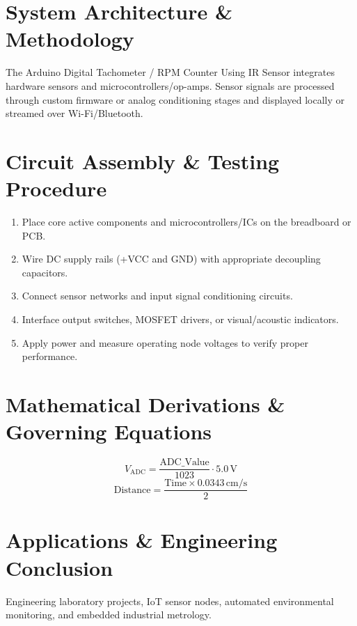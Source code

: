 \documentclass[11pt,a4paper]{article}
\begin{document}
\section{System Architecture \& Methodology}
The Arduino Digital Tachometer / RPM Counter Using IR Sensor integrates hardware sensors and microcontrollers/op-amps. Sensor signals are processed through custom firmware or analog conditioning stages and displayed locally or streamed over Wi-Fi/Bluetooth.

\section{Circuit Assembly \& Testing Procedure}
\begin{enumerate}
    \item Place core active components and microcontrollers/ICs on the breadboard or PCB.
    \item Wire DC supply rails (+VCC and GND) with appropriate decoupling capacitors.
    \item Connect sensor networks and input signal conditioning circuits.
    \item Interface output switches, MOSFET drivers, or visual/acoustic indicators.
    \item Apply power and measure operating node voltages to verify proper performance.
\end{enumerate}

\section{Mathematical Derivations \& Governing Equations}
\begin{equation}
V_{\text{ADC}} = \frac{\text{ADC\_Value}}{1023} \cdot 5.0\,\text{V}
\end{equation}
\begin{equation}
\text{Distance} = \frac{\text{Time} \times 0.0343\,\text{cm/s}}{2}
\end{equation}

\section{Applications \& Engineering Conclusion}
Engineering laboratory projects, IoT sensor nodes, automated environmental monitoring, and embedded industrial metrology.
\end{document}
